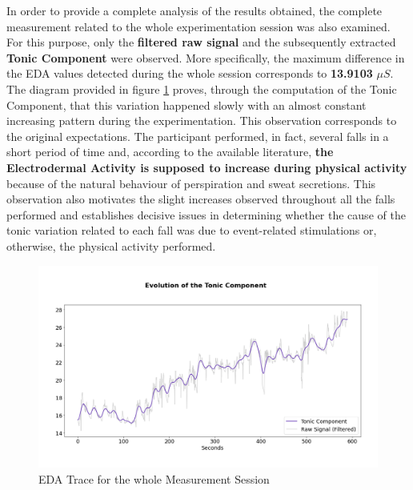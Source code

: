 In order to provide a complete analysis of the results obtained, the complete measurement related to the whole experimentation session was also examined. For this purpose, only the \textbf{filtered raw signal} and the subsequently extracted \textbf{Tonic Component} were observed. More specifically, the maximum difference in the EDA values detected during the whole session corresponds to \textbf{13.9103} $\mu S$. The diagram provided in figure \ref{fig:movisens-global} proves, through the computation of the Tonic Component, that this variation happened slowly with an almost constant increasing pattern during the experimentation. This observation corresponds to the original expectations. The participant performed, in fact, several falls in a short period of time and, according to the available literature, \textbf{the Electrodermal Activity is supposed to increase during physical activity} \cite{eda-interval-4} because of the natural behaviour of perspiration and sweat secretions. This observation also motivates the slight increases observed throughout all the falls performed and establishes decisive issues in determining whether the cause of the tonic variation related to each fall was due to event-related stimulations or, otherwise, the physical activity performed.


\begin{figure}[h]
    \centering
    \includegraphics[width=\textwidth]{./images/movisens/Global.png}
    \caption{EDA Trace for the whole Measurement Session}
    \label{fig:movisens-global}
\end{figure}
